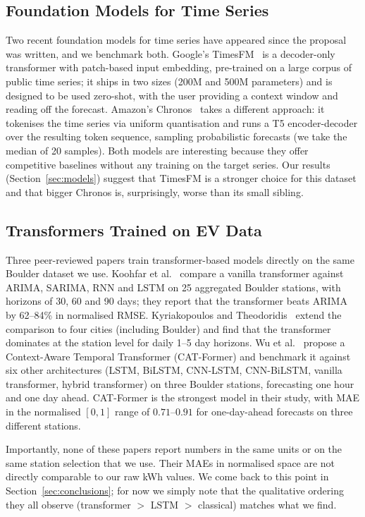 \subsection{Foundation Models for Time Series}

Two recent foundation models for time series have appeared since the
proposal was written, and we benchmark both. Google's
TimesFM~\cite{das2024timesfm} is a decoder-only transformer with
patch-based input embedding, pre-trained on a large corpus of public
time series; it ships in two sizes (200M and 500M parameters) and is
designed to be used zero-shot, with the user providing a context
window and reading off the forecast. Amazon's
Chronos~\cite{ansari2024chronos} takes a different approach: it
tokenises the time series via uniform quantisation and runs a T5
encoder-decoder over the resulting token sequence, sampling
probabilistic forecasts (we take the median of 20 samples). Both
models are interesting because they offer competitive baselines
without any training on the target series. Our results
(Section~\ref{sec:models}) suggest that TimesFM is a stronger choice
for this dataset and that bigger Chronos is, surprisingly, worse than
its small sibling.

\subsection{Transformers Trained on EV Data}

Three peer-reviewed papers train transformer-based models directly on
the same Boulder dataset we use. Koohfar et
al.~\cite{koohfar2023transformer} compare a vanilla transformer
against ARIMA, SARIMA, RNN and LSTM on 25 aggregated Boulder stations,
with horizons of 30, 60 and 90 days; they report that the transformer
beats ARIMA by 62--84\% in normalised RMSE.
Kyriakopoulos and Theodoridis~\cite{kyriakopoulos2025comparative}
extend the comparison to four cities (including Boulder) and find that
the transformer dominates at the station level for daily 1--5 day
horizons. Wu et al.~\cite{wu2025catformer} propose a Context-Aware
Temporal Transformer (CAT-Former) and benchmark it against six other
architectures (LSTM, BiLSTM, CNN-LSTM, CNN-BiLSTM, vanilla
transformer, hybrid transformer) on three Boulder stations,
forecasting one hour and one day ahead. CAT-Former is the strongest
model in their study, with MAE in the normalised $[0,1]$ range of
$0.71$--$0.91$ for one-day-ahead forecasts on three different
stations.

Importantly, none of these papers report numbers in the same units or
on the same station selection that we use. Their MAEs in normalised
space are not directly comparable to our raw kWh values. We come back
to this point in Section~\ref{sec:conclusions}; for now we simply note
that the qualitative ordering they all observe (transformer $>$ LSTM
$>$ classical) matches what we find.

